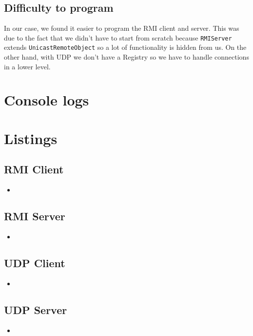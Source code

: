 \documentclass{article}
\newcommand{\insertcode}[2]{\begin{itemize}\item[]\end{itemize}} %
\begin{document}
\subsection{Difficulty to program}
In our case, we found it easier to program the RMI client and server. This was due to the fact
that we didn't have to start from scratch because \texttt{RMIServer} extends \texttt{UnicastRemoteObject} so 
a lot of functionality is hidden from us. On the other hand, with UDP we don't have a Registry
so we have to handle connections in a lower level.
\section{Console logs}

\section{Listings}
\subsection{RMI Client}
\insertcode{"rmi/RMIClient.java"}{RMI Client}

\subsection{RMI Server}
\insertcode{"rmi/RMIServer.java"}{RMI Server}

\subsection{UDP Client}
\insertcode{"udp/UDPClient.java"}{UDP Client}

\subsection{UDP Server}
\insertcode{"udp/UDPServer.java"}{UDP Server}
\end{document}
